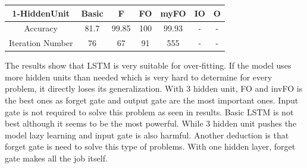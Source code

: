 \documentclass[12pt, letterpaper]{article}
\begin{document}
\begin{center}
\begin{tabular}{ |c|c|c|c|c|c|c|  } 
 \hline
1-HiddenUnit      & Basic  &  F     &  FO       & myFO  & IO    &    O  \\ \hline 
Accuracy          & 81.7    &  99.85   &  100      & 99.93  & -  & - \\ \hline
Iteration Number  & 76     &  67    &   91      & 555   & 
-  & -\\
 \hline
\end{tabular}
\end{center}

	The results show that LSTM is very suitable for over-fitting. If the model uses more hidden units than needed which is very hard to determine for every problem, it directly loses its generalization. With 3 hidden unit, FO and invFO is the best ones as forget gate and output gate are the most important ones. Input gate is not required to solve this problem as seen in results. Basic LSTM is not best although it seems to be the most powerful. While 3 hidden unit pushes the model lazy learning and input gate is also harmful. Another deduction is that forget gate is need to solve this type of problems. With one hidden layer, forget gate makes all the job itself.
\end{document}
